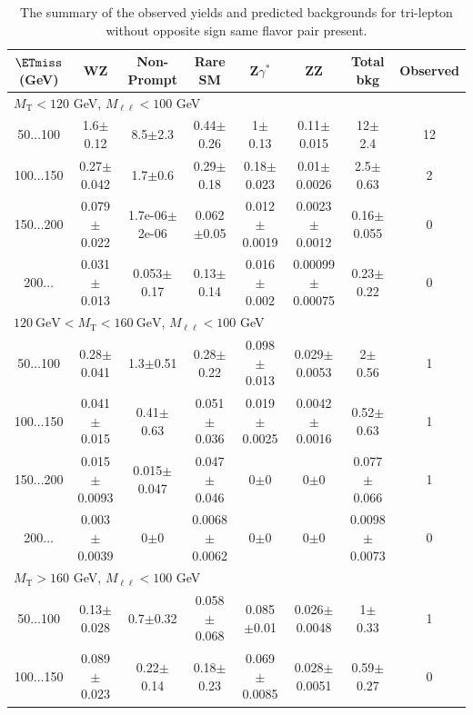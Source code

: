 \begin{landscape}
\begin{table}
\begin{center}
\begin{tabular}{| c | c c c c c c c | }
\hline\hline
\end{tabular}
\end{center}
\end{table}
\begin{table}
\begin{center}
\caption{\label{tab:OSSF0tau0} The summary of the observed yields and predicted backgrounds for tri-lepton 
without opposite sign same flavor pair present. }
\begin{tabular}{| c | c c c c c c c | }\hline\hline
$\ETmiss$ (GeV) & WZ & Non-Prompt & Rare SM & Z$\gamma^*$ & ZZ & Total bkg & Observed\\\hline\hline
\multicolumn{8}{l}{$M_{\text{T}} < 120$ GeV, $M_{\ell\ell} < 100$ GeV}\\\hline\hline
50$\dots$100&1.6$\pm$0.12&8.5$\pm$2.3&0.44$\pm$0.26&1$\pm$0.13&0.11$\pm$0.015&12$\pm$2.4&12\\
100$\dots$150&0.27$\pm$0.042&1.7$\pm$0.6&0.29$\pm$0.18&0.18$\pm$0.023&0.01$\pm$0.0026&2.5$\pm$0.63&2\\
150$\dots$200&0.079$\pm$0.022&1.7e-06$\pm$2e-06&0.062$\pm$0.05&0.012$\pm$0.0019&0.0023$\pm$0.0012&0.16$\pm$0.055&0\\
200$\dots$&0.031$\pm$0.013&0.053$\pm$0.17&0.13$\pm$0.14&0.016$\pm$0.002&0.00099$\pm$0.00075&0.23$\pm$0.22&0\\
\hline\hline
\multicolumn{8}{l}{$120~\mathrm{GeV} < M_{\text{T}} < 160~\mathrm{GeV}$, $M_{\ell\ell} < 100$ GeV}\\\hline\hline
50$\dots$100&0.28$\pm$0.041&1.3$\pm$0.51&0.28$\pm$0.22&0.098$\pm$0.013&0.029$\pm$0.0053&2$\pm$0.56&1\\
100$\dots$150&0.041$\pm$0.015&0.41$\pm$0.63&0.051$\pm$0.036&0.019$\pm$0.0025&0.0042$\pm$0.0016&0.52$\pm$0.63&1\\
150$\dots$200&0.015$\pm$0.0093&0.015$\pm$0.047&0.047$\pm$0.046&0$\pm$0&0$\pm$0&0.077$\pm$0.066&1\\
200$\dots$&0.003$\pm$0.0039&0$\pm$0&0.0068$\pm$0.0062&0$\pm$0&0$\pm$0&0.0098$\pm$0.0073&0\\
\hline\hline
\multicolumn{8}{l}{$M_{\text{T}} > 160$ GeV, $M_{\ell\ell} < 100$ GeV}\\\hline\hline
50$\dots$100&0.13$\pm$0.028&0.7$\pm$0.32&0.058$\pm$0.068&0.085$\pm$0.01&0.026$\pm$0.0048&1$\pm$0.33&1\\
100$\dots$150&0.089$\pm$0.023&0.22$\pm$0.14&0.18$\pm$0.23&0.069$\pm$0.0085&0.028$\pm$0.0051&0.59$\pm$0.27&0\\

\end{tabular}
\end{center}
\end{table}
\end{landscape}
